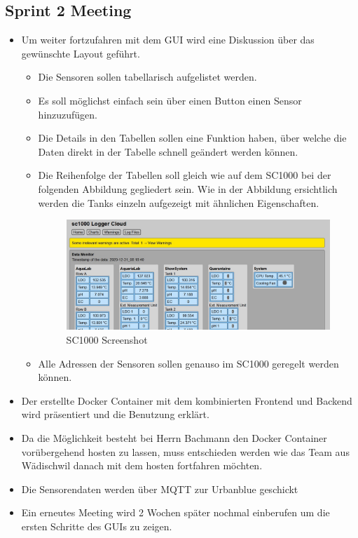 \documentclass[../main.tex]{subfiles}
\begin{document}
	\subsection{Sprint 2 Meeting}
	\begin{itemize}
		\item Um weiter fortzufahren mit dem GUI wird eine Diskussion über das gewünschte Layout geführt. 
		\begin{itemize}
			\item Die Sensoren sollen tabellarisch aufgelistet werden. 
			\item Es soll möglichst einfach sein über einen Button einen Sensor hinzuzufügen.
			\item Die Details in den Tabellen sollen eine Funktion haben, über welche die Daten direkt in der Tabelle schnell geändert werden können.
			\item Die Reihenfolge der Tabellen soll gleich wie auf dem SC1000 bei der folgenden Abbildung gegliedert sein.
			Wie in der Abbildung ersichtlich werden die Tanks einzeln aufgezeigt mit ähnlichen Eigenschaften. 
			\begin{figure}[h]
				\centering
				\includegraphics[scale=0.4]{../images/SC1000_Example}
				\caption{SC1000 Screenshot}
				\label{fig:SC1000_Example}
			\end{figure}
		
			\item Alle Adressen der Sensoren sollen genauso im SC1000 geregelt werden können.
		\end{itemize}
		\item Der erstellte Docker Container mit dem kombinierten Frontend und Backend wird präsentiert und die Benutzung erklärt.
		\item Da die Möglichkeit besteht bei Herrn Bachmann den Docker Container vorübergehend hosten zu lassen, muss entschieden werden wie das Team aus Wädischwil danach mit dem hosten fortfahren möchten.
		\item Die Sensorendaten werden über MQTT zur Urbanblue geschickt
		\item Ein erneutes Meeting wird 2 Wochen später nochmal einberufen um die ersten Schritte des GUIs zu zeigen.
	\end{itemize}
\end{document}

